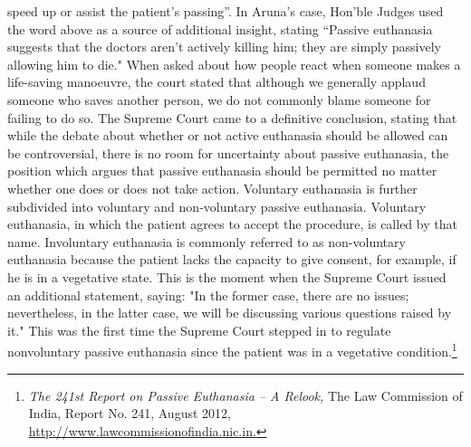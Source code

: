 \begin{multicols}{2}
speed up or assist the patient's passing”. In Aruna's case, Hon’ble Judges used the word above
as a source of additional insight, stating “Passive euthanasia suggests that the doctors aren't
actively killing him; they are simply passively allowing him to die." When asked about how
people react when someone makes a life-saving manoeuvre, the court stated that although we
generally applaud someone who saves another person, we do not commonly blame someone
for failing to do so. The Supreme Court came to a definitive conclusion, stating that while the
debate about whether or not active euthanasia should be allowed can be controversial, there is
no room for uncertainty about passive euthanasia, the position which argues that passive
euthanasia should be permitted no matter whether one does or does not take action. Voluntary
euthanasia is further subdivided into voluntary and non-voluntary passive euthanasia.
Voluntary euthanasia, in which the patient agrees to accept the procedure, is called by that
name. Involuntary euthanasia is commonly referred to as non-voluntary euthanasia because
the patient lacks the capacity to give consent, for example, if he is in a vegetative state. This
is the moment when the Supreme Court issued an additional statement, saying: "In the former
case, there are no issues; nevertheless, in the latter case, we will be discussing various
questions raised by it." This was the first time the Supreme Court stepped in to regulate nonvoluntary passive euthanasia since the patient was in a vegetative condition.\footnote{\textit{The 241st Report on Passive Euthanasia – A Relook,} The Law Commission of India, Report No. 241, August 2012,\\ \url{http://www.lawcommissionofindia.nic.in.}}


\end{multicols}
